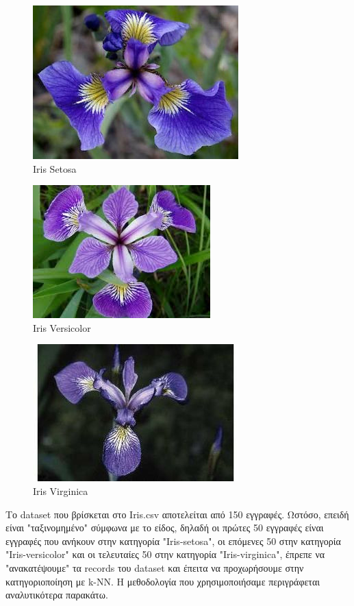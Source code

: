 \documentclass[12pt]{article}
\newenvironment{matlab}
	{\begin{figure}[H]\centering\captionsetup{justification=centering}}
	{\end{figure}}
\begin{document}
\begin{matlab}
	\includegraphics[scale=0.8]{images/iris_setosa.jpg}
	\caption{Iris Setosa}
\end{matlab}

\begin{matlab}
	\includegraphics[scale=0.89]{images/iris_versicolor.jpeg}
	\caption{Iris Versicolor}
\end{matlab}

\begin{matlab}
	\includegraphics[scale=0.8]{images/iris_virginica.jpg}
	\caption{Iris Virginica}
\end{matlab}

Το dataset που βρίσκεται στο Iris.csv αποτελείται από 150 εγγραφές. Ωστόσο, επειδή είναι "ταξινομημένο" σύμφωνα με το είδος, δηλαδή οι πρώτες 50 εγγραφές είναι εγγραφές που ανήκουν στην κατηγορία "Iris-setosa", οι επόμενες 50 στην κατηγορία "Iris-versicolor" και οι τελευταίες 50 στην κατηγορία "Iris-virginica", έπρεπε να "ανακατέψουμε" τα records του dataset και έπειτα να προχωρήσουμε στην κατηγοριοποίηση με k-NN. Η μεθοδολογία που χρησιμοποιήσαμε περιγράφεται αναλυτικότερα παρακάτω. \\
\end{document}
